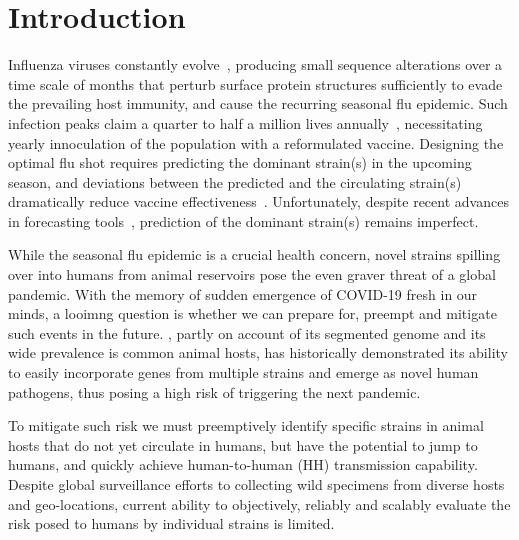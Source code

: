 \documentclass[onecolumn, compsoc,10pt]{IEEEtran}
\begin{document}
\vspace{10pt}
\section*{Introduction}

Influenza viruses constantly evolve~\cite{dos2016influenza},  producing small sequence alterations over a time scale of months  that  perturb surface protein structures sufficiently to evade the prevailing host immunity, and cause the  recurring seasonal flu epidemic. Such  infection peaks claim a quarter to half a million lives annually~\cite{huddleston2020integrating},  necessitating yearly innoculation of the population with a  reformulated  vaccine.  Designing the optimal flu shot requires predicting the dominant  strain(s)  in the upcoming season, and deviations between the predicted and the circulating strain(s) dramatically reduce  vaccine effectiveness~\cite{tricco2013comparing}. Unfortunately,  despite  recent advances in forecasting tools~\cite{neher2014predicting,huddleston2020integrating}, prediction of the dominant strain(s) remains imperfect. 

While the seasonal flu epidemic is a crucial health concern, novel \infl strains spilling over into humans from animal reservoirs pose the even graver threat of a global pandemic. With the memory of sudden emergence of   COVID-19 fresh in our minds, a looimng question  is whether we can prepare for, preempt and mitigate such events in the future.  \infl,  partly on account of its segmented genome and its wide prevalence is common animal hosts, has historically demonstrated its ability to easily incorporate genes from multiple strains and emerge as novel human pathogens,  thus posing a high risk of triggering the next  pandemic.

To mitigate such risk we must preemptively identify specific strains in animal hosts that do not yet circulate in humans, but   have the potential to  jump to humans, and quickly achieve human-to-human (HH) transmission capability. Despite global surveillance efforts to  collecting wild specimens from diverse hosts and geo-locations,  current ability to objectively, reliably and scalably  evaluate the risk posed to  humans by  individual strains  is limited.
\end{document}
